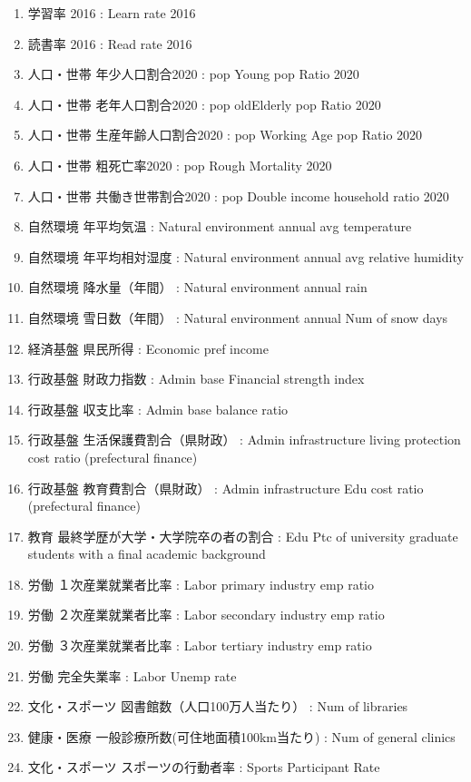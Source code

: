 \begin{multicols}{2}
\begin{enumerate}
  \item 学習率 2016  :  Learn rate 2016
  \item 読書率 2016  :  Read rate 2016
  \item 人口・世帯 年少人口割合2020  :  pop Young pop Ratio 2020
  \item 人口・世帯 老年人口割合2020  :  pop oldElderly pop Ratio 2020
  \item 人口・世帯 生産年齢人口割合2020  :  pop Working Age pop Ratio 2020
  \item 人口・世帯 粗死亡率2020  :  pop Rough Mortality 2020
  \item 人口・世帯 共働き世帯割合2020  :  pop Double income household ratio 2020
  \item 自然環境 年平均気温  :  Natural environment annual avg temperature
  \item 自然環境 年平均相対湿度  :  Natural environment annual avg relative humidity
  \item 自然環境 降水量（年間）  :  Natural environment annual rain
  \item 自然環境 雪日数（年間）  :  Natural environment annual Num of snow days
  \item 経済基盤 県民所得  :  Economic pref income
  \item 行政基盤 財政力指数  :  Admin base Financial strength index
  \item 行政基盤 収支比率  :  Admin base balance ratio
  \item 行政基盤 生活保護費割合（県財政）  :  Admin infrastructure living protection cost ratio (prefectural finance)
  \item 行政基盤 教育費割合（県財政）  :  Admin infrastructure Edu cost ratio (prefectural finance)
  \item 教育 最終学歴が大学・大学院卒の者の割合  :  Edu Ptc of university graduate students with a final academic background
  \item 労働 １次産業就業者比率  :  Labor primary industry emp ratio
  \item 労働 ２次産業就業者比率  :  Labor secondary industry emp ratio
  \item 労働 ３次産業就業者比率  :  Labor tertiary industry emp ratio
  \item 労働 完全失業率  :  Labor Unemp rate
  \item 文化・スポーツ 図書館数（人口100万人当たり）  :  Num of libraries
  \item 健康・医療 一般診療所数(可住地面積100km当たり)  :  Num of general clinics
  \item 文化・スポーツ スポーツの行動者率  :  Sports Participant Rate

\end{enumerate}
\end{multicols}
